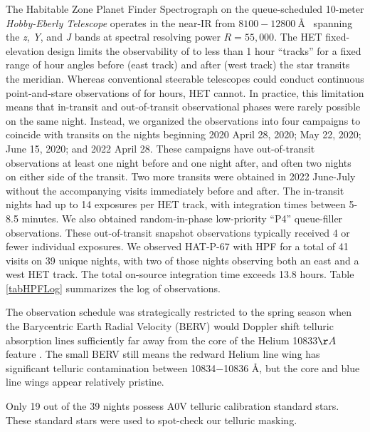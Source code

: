 \documentclass[twocolumn]{aastex631}
\begin{document}
The Habitable Zone Planet Finder Spectrograph \citep[HPF;][]{2012SPIE.8446E..1SM,2014SPIE.9147E..1GM, 2019Optic...6..233M} on the queue-scheduled 10-meter \emph{Hobby-Eberly Telescope} \citep[HET;][]{1998SPIE.3352...34R} operates in the near-IR from $8100-12800~$\AA~ spanning the \textit{z}, \textit{Y}, and \textit{J} bands at spectral resolving power $R=55,000$. The HET fixed-elevation design \citep{2007PASP..119..556S} limits the observability of  to less than 1 hour ``tracks'' for a fixed range of hour angles before (east track) and after (west track) the star transits the meridian.  Whereas conventional steerable telescopes could conduct continuous point-and-stare observations of  for hours, HET cannot.  In practice, this limitation means that in-transit and out-of-transit observational phases were rarely possible on the same night.  Instead, we organized the observations into four campaigns to coincide with  transits on the nights beginning 2020 April 28, 2020; May 22, 2020; June 15, 2020; and 2022 April 28.  These campaigns have out-of-transit observations at least one night before and one night after, and often two nights on either side of the transit.  Two more transits were obtained in 2022 June-July without the accompanying visits immediately before and after.  The in-transit nights had up to 14 exposures per HET track, with integration times between 5-8.5 minutes.  We also obtained random-in-phase low-priority ``P4'' queue-filler observations.  These out-of-transit snapshot observations typically received 4 or fewer individual exposures.  We observed HAT-P-67 with HPF for a total of 41 visits on 39 unique nights, with two of those nights observing both an east and a west HET track.  The total on-source integration time exceeds 13.8 hours.  Table \ref{tabHPFLog} summarizes the log of observations.

The observation schedule was strategically restricted to the spring season when the Barycentric Earth Radial Velocity (BERV) would Doppler shift telluric absorption lines sufficiently far away from the core of the Helium 10833$\AA~$ feature \citep{2022ApJ...939L..11S}.  The small BERV still means the redward Helium line wing has significant telluric contamination between 10834$-$10836 \AA, but the core and blue line wings appear relatively pristine.

Only 19 out of the 39 nights possess A0V telluric calibration standard stars.  These standard stars were used to spot-check our telluric masking.
\end{document}
